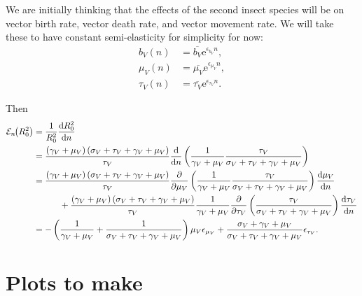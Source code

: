 \documentclass{article}
\newcommand{\md}{\mathrm{d}}
\newcommand{\me}{\mathrm{e}}
\newcommand{\elasticity}[2]{\mathcal{E}_{#2}\negthickspace\left({#1}\right)}
\begin{document}
We are initially thinking that the effects of the second insect
species will be on vector birth rate, vector death rate, and vector
movement rate.  We will take these to have constant semi-elasticity
for simplicity for now:
\begin{equation}
  \begin{split}
    b_V(n) &= \overline{b_V} \me^{\epsilon_{b_V} n},
    \\
    \mu_V(n) &= \overline{\mu_V} \me^{\epsilon_{\mu_V} n},
    \\
    \tau_V(n) &= \overline{\tau_V} \me^{\epsilon_{\tau_V} n}.
  \end{split}
\end{equation}

Then
\begin{equation}
  \begin{split}
    \elasticity{R_0^2}{n} &=
    \frac{1}{R_0^2} \frac{\md R_0^2}{\md n}
    \\
    &=
    \frac{\left(\gamma_V + \mu_V\right)
      \left(\sigma_V + \tau_V + \gamma_V + \mu_V\right)}
    {\tau_V}
    \frac{\md}{\md n}
    \left(
      \frac{1}{\gamma_V + \mu_V}
      \frac{\tau_V}{\sigma_V + \tau_V + \gamma_V + \mu_V}
    \right)
    \\
    &=
    \frac{\left(\gamma_V + \mu_V\right)
      \left(\sigma_V + \tau_V + \gamma_V + \mu_V\right)}
    {\tau_V}
    \frac{\partial}{\partial \mu_V}
    \left(
      \frac{1}{\gamma_V + \mu_V}
      \frac{\tau_V}{\sigma_V + \tau_V + \gamma_V + \mu_V}
    \right)
    \frac{\md \mu_V}{\md n}
    \\ & \quad\quad\quad {}
    + \frac{\left(\gamma_V + \mu_V\right)
      \left(\sigma_V + \tau_V + \gamma_V + \mu_V\right)}
    {\tau_V}
    \frac{1}{\gamma_V + \mu_V}
    \frac{\partial}{\partial \tau_V}
    \left(
      \frac{\tau_V}{\sigma_V + \tau_V + \gamma_V + \mu_V}
    \right)
    \frac{\md \tau_V}{\md n}
    \\
    &=
    - \left(
      \frac{1}{\gamma_V + \mu_V}
      +
      \frac{1}{\sigma_V + \tau_V + \gamma_V + \mu_V}
    \right)
    \mu_V \epsilon_{\mu_V}
    +
    \frac{\sigma_V + \gamma_V + \mu_V}
    {\sigma_V + \tau_V + \gamma_V + \mu_V}
    \epsilon_{\tau_V}.
  \end{split}
\end{equation}


\section{Plots to make}
\end{document}

